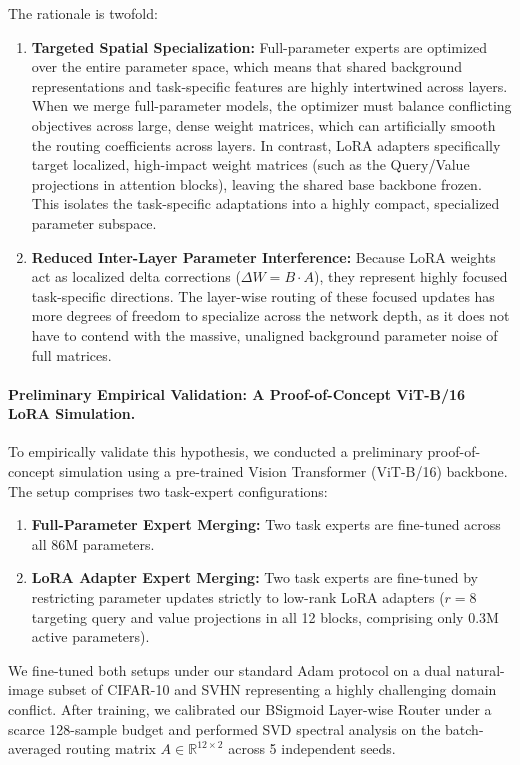 The rationale is twofold:
\begin{enumerate}
    \item \textbf{Targeted Spatial Specialization:} Full-parameter experts are optimized over the entire parameter space, which means that shared background representations and task-specific features are highly intertwined across layers. When we merge full-parameter models, the optimizer must balance conflicting objectives across large, dense weight matrices, which can artificially smooth the routing coefficients across layers. In contrast, LoRA adapters specifically target localized, high-impact weight matrices (such as the Query/Value projections in attention blocks), leaving the shared base backbone frozen. This isolates the task-specific adaptations into a highly compact, specialized parameter subspace.
    \item \textbf{Reduced Inter-Layer Parameter Interference:} Because LoRA weights act as localized delta corrections ($\Delta W = B \cdot A$), they represent highly focused task-specific directions. The layer-wise routing of these focused updates has more degrees of freedom to specialize across the network depth, as it does not have to contend with the massive, unaligned background parameter noise of full matrices.
\end{enumerate}

\paragraph{Preliminary Empirical Validation: A Proof-of-Concept ViT-B/16 LoRA Simulation.}
To empirically validate this hypothesis, we conducted a preliminary proof-of-concept simulation using a pre-trained Vision Transformer (ViT-B/16) backbone. The setup comprises two task-expert configurations:
\begin{enumerate}
    \item \textbf{Full-Parameter Expert Merging:} Two task experts are fine-tuned across all $86\text{M}$ parameters.
    \item \textbf{LoRA Adapter Expert Merging:} Two task experts are fine-tuned by restricting parameter updates strictly to low-rank LoRA adapters ($r=8$ targeting query and value projections in all 12 blocks, comprising only $0.3\text{M}$ active parameters).
\end{enumerate}
We fine-tuned both setups under our standard Adam protocol on a dual natural-image subset of CIFAR-10 and SVHN representing a highly challenging domain conflict. After training, we calibrated our BSigmoid Layer-wise Router under a scarce 128-sample budget and performed SVD spectral analysis on the batch-averaged routing matrix $A \in \mathbb{R}^{12 \times 2}$ across 5 independent seeds.


